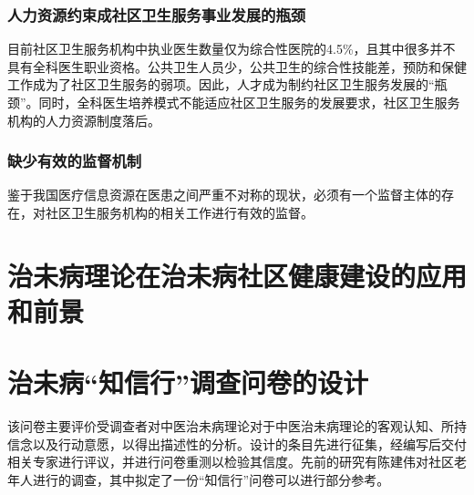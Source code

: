 \subsubsection{人力资源约束成社区卫生服务事业发展的瓶颈}
目前社区卫生服务机构中执业医生数量仅为综合性医院的4.5\%，且其中很多并不具有全科医生职业资格。公共卫生人员少，公共卫生的综合性技能差，预防和保健工作成为了社区卫生服务的弱项。因此，人才成为制约社区卫生服务发展的“瓶颈”。同时，全科医生培养模式不能适应社区卫生服务的发展要求，社区卫生服务机构的人力资源制度落后。
\subsubsection{缺少有效的监督机制}
鉴于我国医疗信息资源在医患之间严重不对称的现状，必须有一个监督主体的存在，对社区卫生服务机构的相关工作进行有效的监督。
\section{治未病理论在治未病社区健康建设的应用和前景}

\section{治未病“知信行”调查问卷的设计}
该问卷主要评价受调查者对中医治未病理论对于中医治未病理论的客观认知、所持信念以及行动意愿，以得出描述性的分析。设计的条目先进行征集，经编写后交付相关专家进行评议，并进行问卷重测以检验其信度。先前的研究有陈建伟对社区老年人进行的调查\cite{cjw_1_2009}，其中拟定了一份“知信行”问卷可以进行部分参考。
